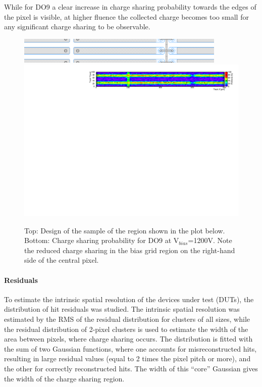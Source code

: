  While for DO9 a clear increase in charge sharing probability towards the edges of the pixel is visible, at higher fluence the collected charge becomes too small for any significant charge sharing to be observable. 
\begin{figure}[!htpb]
 \begin{center}
 \hspace{-.28cm}
  \includegraphics[width=0.887\textwidth]{n_pixel_charge_share_v5_2.png}
  \includegraphics[width=\textwidth]{Oct_P8_1_9_9_1_D10_qshare.pdf}
 \end{center}
 \caption{Top: Design of the sample of the region shown in the plot below. Bottom: Charge sharing probability for DO9 at V$_{bias}$=1200V. Note the reduced charge sharing in the bias grid region on the right-hand side of the central pixel. \label{fig:n-in-n:DO9_qshare}}
\end{figure}

\paragraph{Residuals}
To estimate the intrinsic spatial resolution of the devices under test (DUTs),
 the distribution of hit residuals was studied. The intrinsic spatial resolution was estimated by the RMS of the 
 residual distribution for clusters of all sizes, while the residual distribution of 2-pixel clusters is used to 
 estimate the width of the area between pixels, where charge sharing occurs. The distribution is fitted with 
 the sum of two Gaussian functions, where one accounts for misreconstructed hits, resulting in large 
 residual values (equal to 2 times the pixel pitch or more), and the other for correctly reconstructed hits. The 
 width of this ``core'' Gaussian gives the width of the charge sharing region.
 
